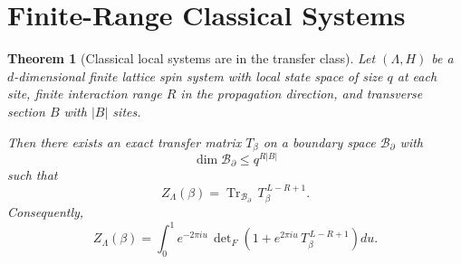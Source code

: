 \documentclass[12pt]{article}
\theoremstyle{plain}
\newtheorem{theorem}{Theorem}[section]
\theoremstyle{definition}
\numberwithin{equation}{section}
\DeclareMathOperator{\Tr}{Tr}
\begin{document}
\section{Finite-Range Classical Systems}\label{sec:classical}

\begin{theorem}[Classical local systems are in the transfer class]\label{thm:classical}
Let $(\Lambda,H)$ be a $d$-dimensional finite lattice spin system with
local state space of size $q$ at each site, finite interaction range $R$
in the propagation direction, and transverse section $B$ with $|B|$ sites.

Then there exists an exact transfer matrix $T_\beta$ on a boundary space
$\mathcal{B}_\partial$ with
\begin{equation}\label{eq:chibound}
\dim\mathcal{B}_\partial \leq q^{R|B|}
\end{equation}
such that
\begin{equation}
Z_\Lambda(\beta) = \Tr_{\mathcal{B}_\partial}\,T_\beta^{\,L-R+1}.
\end{equation}
Consequently,
\begin{equation}
\boxed{Z_\Lambda(\beta) = \int_0^1 e^{-2\pi iu}\,
\det\nolimits_F\!\left(1+e^{2\pi iu}\,T_\beta^{\,L-R+1}\right)du.}
\end{equation}
\end{theorem}
\end{document}

